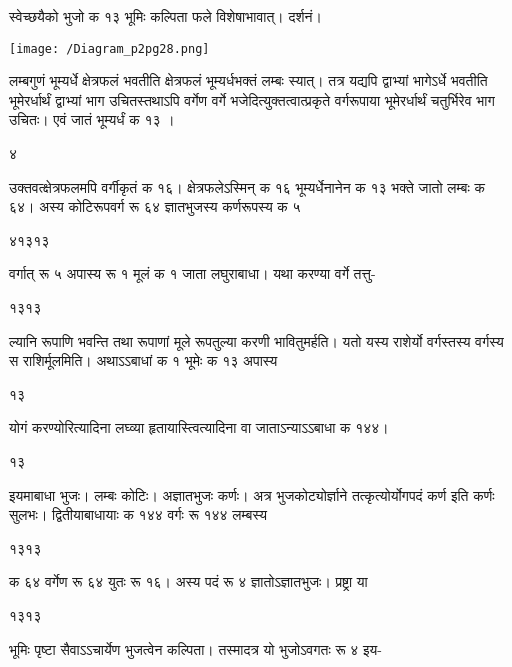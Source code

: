 \documentclass[11pt, openany]{book}
\begin{document}
\begin{sloppypar}
स्वेच्छयैको भुजो क १३ भूमिः कल्पिता फले विशेषाभावात्। दर्शनं।

\begin{center}
    \texttt{[image: /Diagram\_p2pg28.png]}
\end{center}

\hangindent=0.2in लम्बगुणं भूम्यर्धे क्षेत्रफलं भवतीति क्षेत्रफलं भूम्यर्धभक्तं लम्बः स्यात्। तत्र यद्यपि द्वाभ्यां भागेऽर्धे भवतीति भूमेरर्धार्थं द्वाभ्यां भाग उचितस्तथाऽपि वर्गेण वर्गे भजेदित्युक्तत्वात्प्रकृते वर्गरूपाया भूमेरर्धार्थं चतुर्भिरेव भाग उचितः। एवं जातं भूम्यर्धं क १३ ।

\hspace{3.4in}४

\hangindent=0.2in उक्तवत्क्षेत्रफलमपि वर्गीकृतं क १६। क्षेत्रफलेऽस्मिन् क १६ भूम्यर्धेनानेन क १३ भक्ते जातो लम्बः क ६४। अस्य कोटिरूपवर्ग रू ६४ ज्ञातभुजस्य कर्णरूपस्य क ५

\hspace{0.2in}४\hspace{1.55in}१३\hspace{1.75in}१३

\hangindent=0.2in वर्गात् रू ५ अपास्य रू १ मूलं क १ जाता लघुराबाधा। यथा करण्या वर्गे तत्तु-

\hspace{1.5in}१३\hspace{0.35in}१३

\hangindent=0.2in ल्यानि रूपाणि भवन्ति तथा रूपाणां मूले रूपतुल्या करणी भावितुमर्हति। यतो यस्य राशेर्यो वर्गस्तस्य वर्गस्य स राशिर्मूलमिति। अथाऽऽबाधां क १ भूमेः क १३ अपास्य

\hspace{3.9in}१३

\hangindent=0.2in योगं करण्योरित्यादिना लघ्व्या हृतायास्त्वित्यादिना वा जाताऽन्याऽऽबाधा क १४४।

\hspace{4.7in}१३

\hangindent=0.2in इयमाबाधा भुजः। लम्बः कोटिः। अज्ञातभुजः कर्णः। अत्र भुजकोट्योर्ज्ञाने तत्कृत्योर्योगपदं कर्ण इति कर्णः सुलभः। द्वितीयाबाधायाः क १४४ वर्गः रू १४४ लम्बस्य

\hspace{2.5in}१३\hspace{0.75in}१३

\hangindent=0.2in क ६४ वर्गेण रू ६४ युतः रू १६। अस्य पदं रू ४ ज्ञातोऽज्ञातभुजः। प्रष्ट्रा या

\hspace{0.2in}१३\hspace{0.75in}१३

\hangindent=0.2in भूमिः पृष्टा सैवाऽऽचार्येण भुजत्वेन कल्पिता। तस्मादत्र यो भुजोऽवगतः रू ४ इय-
\end{sloppypar}
\thispagestyle{empty}
\newpage
\end{document}
